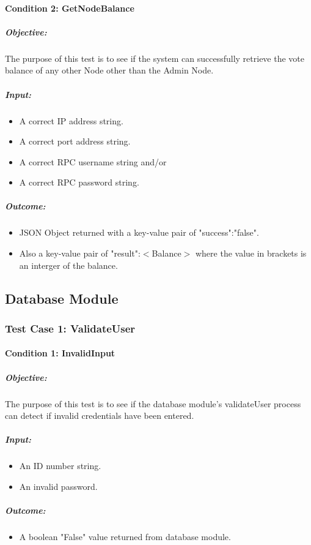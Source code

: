 \documentclass[11pt]{article}
\begin{document}
	\paragraph{Condition 2: GetNodeBalance}	
	\subparagraph{Objective:}
	The purpose of this test is to see if the system can successfully retrieve the vote balance of any other Node other than the Admin Node.
	\subparagraph{Input:}
	\begin{itemize}
		\item A correct IP address string.
		\item A correct port address string.
		\item A correct RPC username string and/or
		\item A correct RPC password string.
	\end{itemize}
	\subparagraph{Outcome:}
	\begin{itemize}
		\item JSON Object returned with a key-value pair of "success":"false".
		\item Also a key-value pair of "result":$<$Balance$>$ where the value in brackets is an interger of the balance.
	\end{itemize}
	
	
	
	
	
		\subsection{Database Module}
		\label{sec:DatabaseModuleTestCases}
		\subsubsection{Test Case 1: ValidateUser}
		\paragraph{Condition 1: InvalidInput}	
		\subparagraph{Objective:}
		The purpose of this test is to see if the database module's validateUser process can detect if invalid credentials have been entered.
		\subparagraph{Input:}
		\begin{itemize}
			\item An ID number string.
			\item An invalid password.
		\end{itemize}
		\subparagraph{Outcome:}
		\begin{itemize}
			\item A boolean "False" value returned from database module.
		\end{itemize}
		
\end{document}
